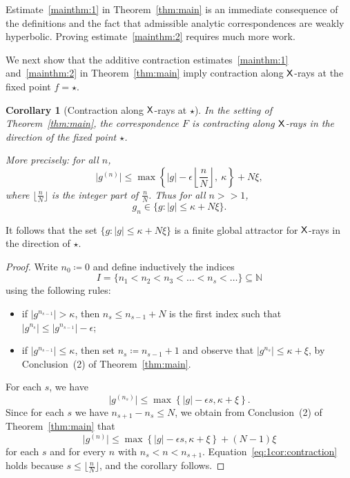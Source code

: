 \documentclass{amsart}
\newcommand\N{{\mathbb{N}}}
\newtheorem{cor}[thm]{Corollary}
\theoremstyle{definition}
\theoremstyle{remark}
\newcommand{\sfX}{{\sf X}}
\renewcommand\gg{>\!\!>}
\begin{document}
Estimate~\eqref{mainthm:1} in Theorem~\ref{thm:main} is an immediate consequence of the definitions and the fact that admissible analytic correspondences are weakly hyperbolic.  Proving estimate~\eqref{mainthm:2} requires much more work.

We next show that the additive contraction estimates~\eqref{mainthm:1} and~\eqref{mainthm:2} in Theorem~\ref{thm:main} imply contraction along $\sfX$-rays at the fixed point $f=\star$.

\begin{cor}[Contraction along $\sfX$-rays at $\star$]\label{cor:contraction}
  In the setting of Theorem~\ref{thm:main}, the correspondence $F$ is contracting along $\sfX$-rays in the direction of the fixed point $\star$.

More precisely: for all $n$,
\begin{equation}\label{eq:1cor:contraction}
\big| g^{(n)}\big| \le \max\left\{ \left| g\right| - \epsilon\left\lfloor \frac{n}{N}\right\rfloor , \ \kappa\right\}+N\xi,
\end{equation}
where $\lfloor \frac{n}{N}\rfloor $ is the integer part of $\frac{n}{N}$.  Thus for all $n \gg 1$,
\begin{equation}\label{eq:2:cor:contraction}
  g_n\in \big\{g : |g| \le \kappa +N\xi\big\}.
\end{equation}
\end{cor}
It follows that the set $\{g : |g| \le \kappa +N\xi\}$ is a finite global attractor for $\sfX$-rays in the direction of $\star$.

\begin{proof}
  Write $n_0\coloneqq 0$ and define inductively the indices \[I=\{n_1 <n_2<n_3<\dots <n_s<\dots \}\subseteq\N\] 
 using the following rules:
 \begin{itemize}
 \item if $\left|g^{n_{s-1}}\right|>\kappa$, then $n_s\le n_{s-1}+N$ is the first index such that  ${\left|g^{n_{s}}\right|\le\left|g^{n_{s-1}}\right|-\epsilon}$;
 \item if $\left|g^{n_{s-1}} \right|\le\kappa$, then set $n_{s}\coloneqq n_{s-1}+1$ and observe that $\left|g^{n_{s}}\right|\le \kappa+\xi$, by Conclusion~(2) of Theorem~\ref{thm:main}.
\end{itemize}  
  
  
For each $s$, we have
\[\big| g^{(n_s)}\big| \le \max\left\{|g| - \epsilon s, \kappa+\xi\right\}. \]
Since for each $s$ we have $n_{s+1}-n_{s}\le N$, we obtain from Conclusion~(2) of Theorem~\ref{thm:main} that 
 \[\big| g^{(n)}\big| \le \max\left\{|g| - \epsilon s, \kappa+\xi\right\}+(N-1)\xi \] 
 for each $s$ and for every $n$ with $n_{s}< n <n_{s+1}$. Equation~\eqref{eq:1cor:contraction} holds because $s\le \lfloor \frac{n}N\rfloor$, and the corollary follows.
\end{proof}
\end{document}
